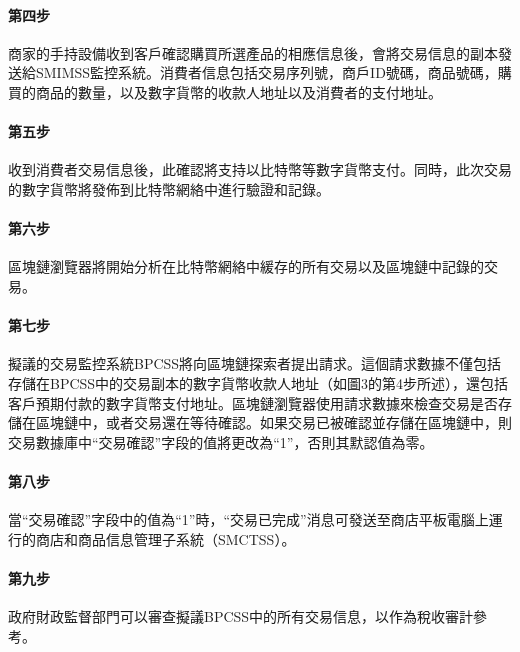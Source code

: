 		\paragraph{第四步}商家的手持設備收到客戶確認購買所選產品的相應信息後，會將交易信息的副本發送給SMIMSS監控系統。消費者信息包括交易序列號，商戶ID號碼，商品號碼，購買的商品的數量，以及數字貨幣的收款人地址以及消費者的支付地址。
		\paragraph{第五步}收到消費者交易信息後，此確認將支持以比特幣等數字貨幣支付。同時，此次交易的數字貨幣將發佈到比特幣網絡中進行驗證和記錄。
		\paragraph{第六步}區塊鏈瀏覽器將開始分析在比特幣網絡中緩存的所有交易以及區塊鏈中記錄的交易。
		\paragraph{第七步}擬議的交易監控系統BPCSS將向區塊鏈探索者提出請求。這個請求數據不僅包括存儲在BPCSS中的交易副本的數字貨幣收款人地址（如圖3的第4步所述），還包括客戶預期付款的數字貨幣支付地址。區塊鏈瀏覽器使用請求數據來檢查交易是否存儲在區塊鏈中，或者交易還在等待確認。如果交易已被確認並存儲在區塊鏈中，則交易數據庫中“交易確認”字段的值將更改為“1”，否則其默認值為零。
		\paragraph{第八步}當“交易確認”字段中的值為“1”時，“交易已完成”消息可發送至商店平板電腦上運行的商店和商品信息管理子系統（SMCTSS）。
		\paragraph{第九步}政府財政監督部門可以審查擬議BPCSS中的所有交易信息，以作為稅收審計參考。

	
